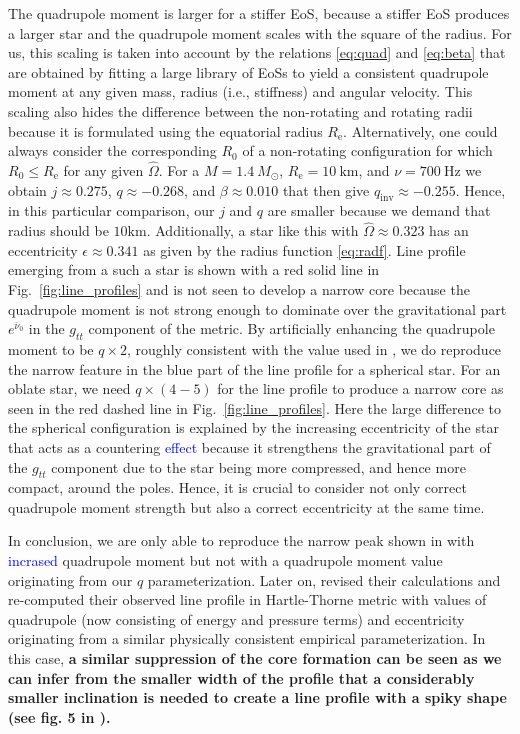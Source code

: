 \documentclass{aa}
\newcommand{\refe}[1]{\textcolor{blue}{{#1}}}
\newcommand{\Ob}{\ensuremath{\hat{\Omega}}}
\newcommand{\nub}{\ensuremath{\bar{\nu}}}
\newcommand{\Msun}{\ensuremath{M_{\odot}}}
\newcommand{\qinv}{\ensuremath{q_{\mathrm{inv}}}}
\begin{document}
The quadrupole moment is larger for a stiffer EoS, because a stiffer EoS produces a larger star and the quadrupole moment scales with the square of the radius.
For us, this scaling is taken into account by the relations \eqref{eq:quad} and \eqref{eq:beta} that are obtained by fitting a large library of EoSs \citep[see][]{BBP13, aGM14} to yield a consistent quadrupole moment at any given mass, radius (i.e., stiffness) and angular velocity.
This scaling also hides the difference between the non-rotating and rotating radii because it is formulated using the equatorial radius $R_{\mathrm{e}}$.
Alternatively, one could always consider the corresponding $R_0$ of a non-rotating configuration for which $R_0 \le R_{\mathrm{e}}$ for any given $\Ob$.
For a $M=1.4~\Msun$, $R_{\mathrm{e}}=10~\mathrm{km}$, and $\nu = 700~\mathrm{Hz}$ we obtain $j \approx 0.275$, $q \approx -0.268$, and $\beta \approx 0.010$ that then give $\qinv \approx -0.255$.
Hence, in this particular comparison, our $j$ and $q$ are smaller because we demand that radius should be $10\mathrm{km}$.
Additionally, a star like this with $\Ob \approx 0.323$ has an eccentricity $\epsilon \approx 0.341$ as given by the radius function \eqref{eq:radf}.
Line profile emerging from a such a star is shown with a red solid line in Fig.~\ref{fig:line_profiles} and is not seen to develop a narrow core because the quadrupole moment is not strong enough to dominate over the gravitational part $e^{\nub_0}$ in the $g_{tt}$ component of the metric.
By artificially enhancing the quadrupole moment to be $q \times 2$, roughly consistent with the value used in \citet{BPO13}, we do reproduce the narrow feature in the blue part of the line profile for a spherical star.
For an oblate star, we need $q \times (4-5)$ for the line profile to produce a narrow core as seen in the red dashed line in Fig.~\ref{fig:line_profiles}.
Here the large difference to the spherical configuration is explained by the increasing eccentricity of the star that acts as a countering \refe{effect} because it strengthens the gravitational part of the $g_{tt}$ component due to the star being more compressed, and hence more compact, around the poles.
Hence, it is crucial to consider not only correct quadrupole moment strength but also a correct eccentricity at the same time.

In conclusion, we are only able to reproduce the narrow peak shown in \citet{BPO13} with \refe{incrased} quadrupole moment but not with a quadrupole moment value originating from our $q$ parameterization.
Later on, \citet{BBP13} revised their calculations and re-computed their observed line profile in Hartle-Thorne metric with values of quadrupole (now consisting of energy and pressure terms) and eccentricity originating from a similar physically consistent empirical parameterization.
In this case, \textbf{a similar suppression of the core formation can be seen as we can infer from the smaller width of the profile that a considerably smaller inclination is needed to create a line profile with a spiky shape (see fig. 5 in \citealt{BBP13}).}
\end{document}
